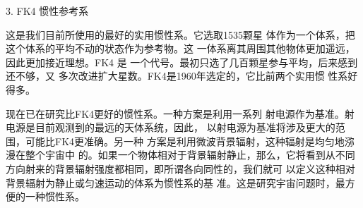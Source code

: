 \textsf{3. FK4 惯性参考系}

这是我们目前所使用的最好的实用惯性系。它选取1535颗星
体作为一个体系，把这个体系的平均不动的状态作为参考物。这
一体系离其周围其他物体更加遥远，因此更加接近理想。FK4
\clearpage\noindent
是
一个代号。最初只选了几百颗星参与平均，后来感到还不够，又
多次改进扩大星数。FK4是1960年选定的，它比前两个实用惯
性系好得多。

现在已在研究比FK4更好的惯性系。一种方案是利用一系列
射电源作为基准。射电源是目前观测到的最远的天体系统，因此，
以射电源为基准将涉及更大的范围，可能比FK4更准确。另一种
方案是利用微波背景辐射，这种辐射是均匀地㳽漫在整个宇宙中
的。如果一个物体相对于背景辐射静止，那么，它将看到从不同
方向射来的背景辐射强度都相同，即所谓各向同性的，我们就可
以定义这种相对背景辐射为静止或匀速运动的体系为惯性系的基
准。这是研究宇宙问题时，最方便的一种惯性系。
